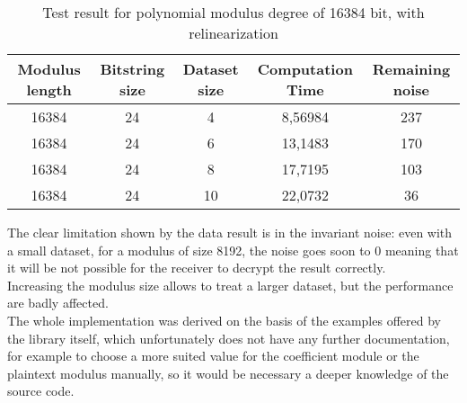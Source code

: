 \documentclass[10pt]{extarticle}
\begin{document}
\begin{table}[!hb]
	\begin{tabular}{||c|c|c|c|c||}
		\hline
		Modulus length & Bitstring size	& Dataset size	& Computation Time	& Remaining noise\\
		\hline\hline
		16384 & 24 & 4 & 8,56984 & 237\\
		\hline
		16384 & 24 & 6 & 13,1483 & 170\\
		\hline
		16384 & 24 & 8 & 17,7195 & 103\\
		\hline
		16384 & 24 & 10 & 22,0732 & 36\\
		\hline
	\end{tabular}
\caption{Test result for polynomial modulus degree of 16384 bit, with relinearization}
\end{table}
\newpage
The clear limitation shown by the data result is in the invariant noise: even with a small dataset, for a modulus of size 8192, the noise goes soon to 0 meaning that it will be not possible for the receiver to decrypt the result correctly.\\Increasing the modulus size allows to treat a larger dataset, but the performance are badly affected.\\The whole implementation was derived on the basis of the examples offered by the library itself, which unfortunately does not have any further documentation, for example to choose a more suited value for the coefficient module or the plaintext modulus manually, so it would be necessary a deeper knowledge of the source code.
\end{document}
